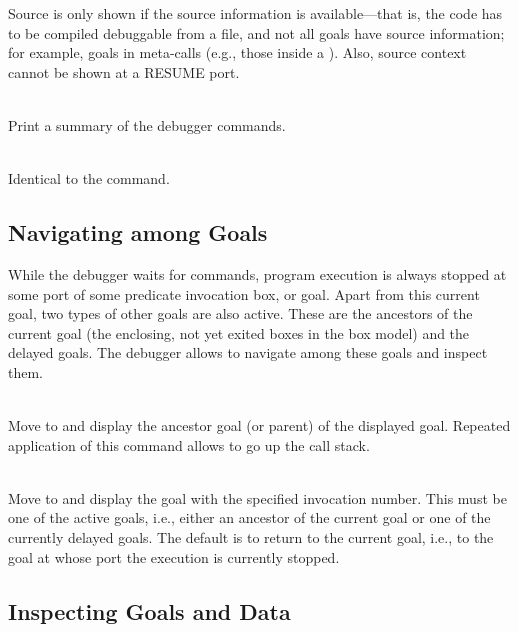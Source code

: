 \begin{descr}{1cm}
Source is only shown if the source information is available---that is,
the code has to be compiled debuggable from a file, and not all goals have
source information; for example, goals in meta-calls (e.g., those inside a
). Also, source context cannot be shown at a RESUME port.

\\
Print a summary of the debugger commands.

\\
Identical to the  command.

\end{descr}


\subsection{Navigating among Goals}

While the debugger waits for commands, program execution is always
stopped at some port of some predicate invocation box, or goal.
Apart from this current goal, two types of other goals are also active.
These are the ancestors of the current goal (the enclosing, not yet
exited boxes in the box model) and the delayed goals.
The debugger allows to navigate among these goals and inspect them.

\begin{descr}{1cm}

\\
Move to and display the ancestor goal (or parent) of the displayed goal.
Repeated application of this command allows to go up the call stack.

\\
Move to and display the goal with the specified invocation number.
This must be one of the active goals, i.e., either an ancestor of the
current goal or one of the currently delayed goals.
The default is to return to the current goal, i.e., to the goal at
whose port the execution is currently stopped.
\end{descr}

\subsection{Inspecting Goals and Data}

